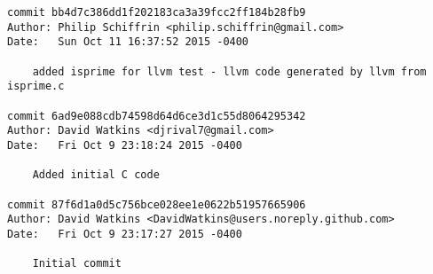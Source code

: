 \begin{verbatim}
commit bb4d7c386dd1f202183ca3a39fcc2ff184b28fb9
Author: Philip Schiffrin <philip.schiffrin@gmail.com>
Date:   Sun Oct 11 16:37:52 2015 -0400

    added isprime for llvm test - llvm code generated by llvm from isprime.c

commit 6ad9e088cdb74598d64d6ce3d1c55d8064295342
Author: David Watkins <djrival7@gmail.com>
Date:   Fri Oct 9 23:18:24 2015 -0400

    Added initial C code

commit 87f6d1a0d5c756bce028ee1e0622b51957665906
Author: David Watkins <DavidWatkins@users.noreply.github.com>
Date:   Fri Oct 9 23:17:27 2015 -0400

    Initial commit
\end{verbatim}